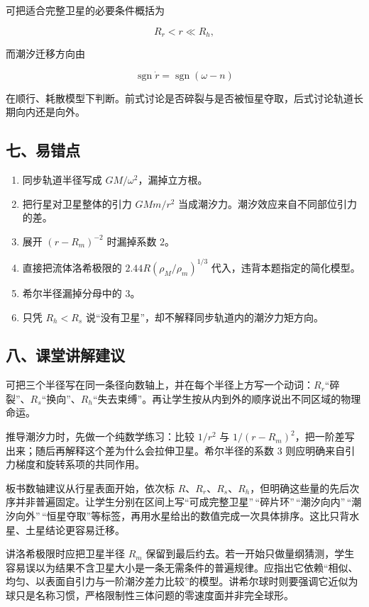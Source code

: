 \documentclass[12pt,a4paper,UTF8]{ctexart}
\newcommand{\tightlist}{\setlength{\itemsep}{0pt}\setlength{\parskip}{0pt}}
\begin{document}
可把适合完整卫星的必要条件概括为

\[R_r<r\ll R_h,\]

而潮汐迁移方向由

\[\operatorname{sgn}\dot r=\operatorname{sgn}(\omega-n)\]

在顺行、耗散模型下判断。前式讨论是否碎裂与是否被恒星夺取，后式讨论轨道长期向内还是向外。

\subsection{七、易错点}\label{ux4e03ux6613ux9519ux70b9-2}

\begin{enumerate}
\def\labelenumi{\arabic{enumi}.}
\tightlist
\item
  同步轨道半径写成 \(GM/\omega^2\)，漏掉立方根。
\item
  把行星对卫星整体的引力 \(GMm/r^2\)
  当成潮汐力。潮汐效应来自不同部位引力的差。
\item
  展开 \((r-R_m)^{-2}\) 时漏掉系数 \(2\)。
\item
  直接把流体洛希极限的 \(2.44R(\rho_M/\rho_m)^{1/3}\)
  代入，违背本题指定的简化模型。
\item
  希尔半径漏掉分母中的 \(3\)。
\item
  只凭 \(R_h<R_s\) 说``没有卫星''，却不解释同步轨道内的潮汐力矩方向。
\end{enumerate}

\subsection{八、课堂讲解建议}\label{ux516bux8bfeux5802ux8bb2ux89e3ux5efaux8bae-2}

可把三个半径写在同一条径向数轴上，并在每个半径上方写一个动词：\(R_r\)``碎裂''、\(R_s\)``换向''、\(R_h\)``失去束缚''。再让学生按从内到外的顺序说出不同区域的物理命运。

推导潮汐力时，先做一个纯数学练习：比较 \(1/r^2\) 与
\(1/(r-R_m)^2\)，把一阶差写出来；随后再解释这个差为什么会拉伸卫星。希尔半径的系数
\(3\) 则应明确来自引力梯度和旋转系项的共同作用。

板书数轴建议从行星表面开始，依次标
\(R\)、\(R_r\)、\(R_s\)、\(R_h\)，但明确这些量的先后次序并非普遍固定。让学生分别在区间上写``可成完整卫星''\,``碎片环''\,``潮汐向内''\,``潮汐向外''\,``恒星夺取''等标签，再用水星给出的数值完成一次具体排序。这比只背水星、土星结论更容易迁移。

讲洛希极限时应把卫星半径 \(R_m\)
保留到最后约去。若一开始只做量纲猜测，学生容易误以为结果不含卫星大小是一条无需条件的普遍规律。应指出它依赖``相似、均匀、以表面自引力与一阶潮汐差力比较''的模型。讲希尔球时则要强调它近似为球只是名称习惯，严格限制性三体问题的零速度面并非完全球形。
\end{document}
